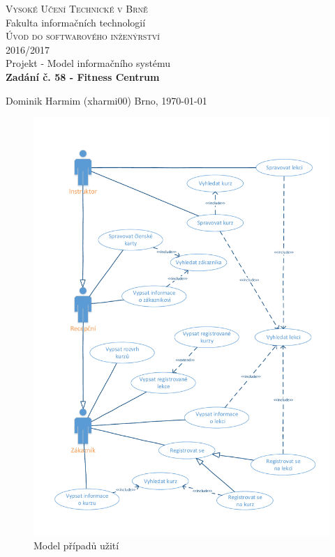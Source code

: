 \documentclass[12pt,a4paper]{report}
\begin{document}
	\begin{titlepage}
		\begin{center}
			\textsc{\LARGE Vysoké Učení Technické v Brně}\\[0.5cm]
			{\LARGE Fakulta informačních technologií }\\[4.0cm]

			\textsc{\LARGE Úvod do softwarového inženýrství}\\[0.5cm]
			\textsc{\LARGE 2016/2017}\\[3.5cm]

			{\LARGE Projekt - Model informačního systému}\\[1.0cm]
			\textbf{\LARGE Zadání č. 58 - Fitness Centrum}
			\end{center}

			\vfill

			\begin{flushleft} 
				\large
				Dominik Harmim (xharmi00)
				\hfill
				Brno, \today
			\end{flushleft}
	\end{titlepage}

	\begin{figure}[H]
		\centering
		\vspace{-5.5cm}
		\centerline{\includegraphics[width=1.32\linewidth]{model_pripadu_uziti.pdf}}
		\caption{Model případů užití}
		\label{modelPripaduUziti}
	\end{figure}
\end{document}
